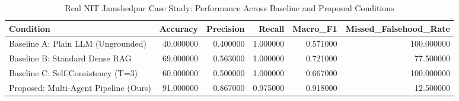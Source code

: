 \begin{table}
\caption{Real NIT Jamshedpur Case Study: Performance Across Baseline and Proposed Conditions}
\label{tab:nitjsr_real_eval}
\begin{tabular}{lrrrrr}
\toprule
Condition & Accuracy & Precision & Recall & Macro_F1 & Missed_Falsehood_Rate \\
\midrule
Baseline A: Plain LLM (Ungrounded) & 40.000000 & 0.400000 & 1.000000 & 0.571000 & 100.000000 \\
Baseline B: Standard Dense RAG & 69.000000 & 0.563000 & 1.000000 & 0.721000 & 77.500000 \\
Baseline C: Self-Consistency (T=3) & 60.000000 & 0.500000 & 1.000000 & 0.667000 & 100.000000 \\
Proposed: Multi-Agent Pipeline (Ours) & 91.000000 & 0.867000 & 0.975000 & 0.918000 & 12.500000 \\
\bottomrule
\end{tabular}
\end{table}
